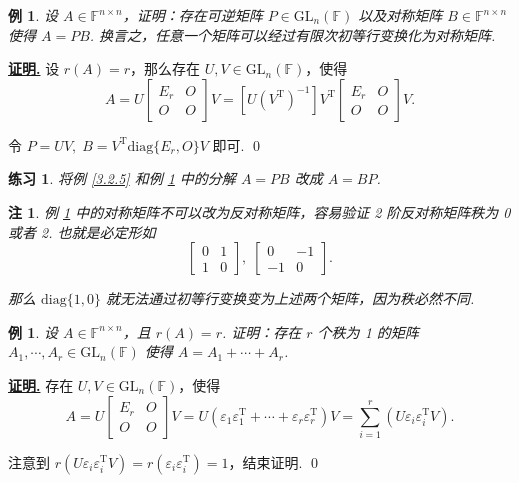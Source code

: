 \documentclass[10pt,openany]{article}
\theoremstyle{thmstyle} %
\newtheorem{practice}{练习}[section]
\theoremstyle{defstyle} %
\theoremstyle{prostyle} %
\theoremstyle{exastyle}
\newtheorem{example}[theorem]{例}
\theoremstyle{remstyle}
\newtheorem{remark}[theorem]{注}
\renewenvironment{proof}[1][证明]{\par\underline{\textbf{#1.}} \;\fangsong}{\qed\par}
\newcommand{\T}{^{\text{T}}}
\newcommand{\F}{\mathbb{F}}
\newcommand{\gfn}{\text{GL}_n(\mathbb{F})}
\newcommand{\n}{^{n \times n}}
\newcommand{\diag}{\mathrm{diag}}
\begin{document}
\begin{example} \label{3.2.6}
	设 \( A \in \F\n \)，证明：存在可逆矩阵 \( P \in \gfn \) 以及对称矩阵 \( B \in \F\n \) 使得 \( A=PB \). 换言之，任意一个矩阵可以经过有限次初等行变换化为对称矩阵.
\end{example}

\begin{proof}
	设 \( r(A)=r \)，那么存在 \( U,V \in \gfn \)，使得 
	\[ A=U\begin{bmatrix}
		E_r & O \\ O & O
	\end{bmatrix}V=[U(V\T)^{-1}]V\T\begin{bmatrix}
		E_r & O \\ O & O
	\end{bmatrix}V. \]
	
	令 \( P=UV, \; B=V\T \diag\{E_r,O\}V \) 即可. 
\end{proof}

\begin{practice}
	将例 \ref{3.2.5} 和例 \ref{3.2.6} 中的分解 \( A=PB \) 改成 \( A=BP \).
\end{practice}

\begin{remark} \label{3.2.7}
	例 \ref{3.2.6} 中的对称矩阵不可以改为反对称矩阵，容易验证 2 阶反对称矩阵秩为 0 或者 2. 也就是必定形如
	\[ \begin{bmatrix}
		0 & 1 \\ 1 & 0
	\end{bmatrix}, \; \begin{bmatrix}
	0 & -1 \\ -1 & 0
	\end{bmatrix}. \]
	
	那么 \( \diag\{1,0\} \) 就无法通过初等行变换变为上述两个矩阵，因为秩必然不同.
\end{remark}

\begin{example} \label{3.2.8}
	设 \( A \in \F\n \)，且  \( r(A)=r \). 证明：存在 \( r \) 个秩为 1 的矩阵 \( A_1,\cdots,A_r \in \gfn \) 使得 \( A=A_1+\cdots+A_r \).
\end{example}

\begin{proof}
	存在 \( U,V \in \gfn \)，使得 
	\[ A=U\begin{bmatrix}
		E_r & O \\ O & O
	\end{bmatrix}V=U(\varepsilon_1\varepsilon_1\T+\cdots+\varepsilon_r\varepsilon_r\T)V=\sum_{i=1}^{r} (U\varepsilon_i\varepsilon_i\T V). \]
	
	注意到 \( r(U\varepsilon_i\varepsilon_i\T V)=r(\varepsilon_i\varepsilon_i\T)=1 \)，结束证明.
\end{proof}
\end{document}
